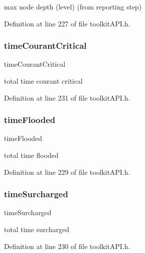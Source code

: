 max node depth (level) (from reporting step) 

Definition at line 227 of file toolkit\+A\+P\+I.\+h.

\mbox{\label{struct_s_m___node_stats_a9b8dde5a8c0d75a55f9037adef91e309}} 
\subsubsection{\texorpdfstring{time\+Courant\+Critical}{timeCourantCritical}}
{\footnotesize\ttfamily time\+Courant\+Critical}

total time courant critical 

Definition at line 231 of file toolkit\+A\+P\+I.\+h.

\mbox{\label{struct_s_m___node_stats_aa442cc713ba8fc1b8faa1d8d7ac6e39a}} 
\subsubsection{\texorpdfstring{time\+Flooded}{timeFlooded}}
{\footnotesize\ttfamily time\+Flooded}

total time flooded 

Definition at line 229 of file toolkit\+A\+P\+I.\+h.

\mbox{\label{struct_s_m___node_stats_ae5c6e5a148cd0c7920e6298adccd4648}} 
\subsubsection{\texorpdfstring{time\+Surcharged}{timeSurcharged}}
{\footnotesize\ttfamily time\+Surcharged}

total time surcharged 

Definition at line 230 of file toolkit\+A\+P\+I.\+h.

